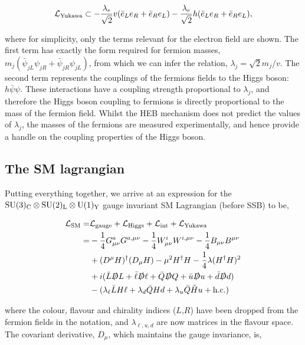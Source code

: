 \begin{equation}
   \mathcal{L}_{\rm{Yukawa}} \subset -\frac{\lambda_e}{\sqrt{2}}v(\bar{e}_Le_R+\bar{e}_Re_L)-\frac{\lambda_e}{\sqrt{2}}h(\bar{e}_Le_R+\bar{e}_Re_L),
\end{equation}

\noindent
where for simplicity, only the terms relevant for the electron field are shown. The first term has exactly the form required for fermion masses, $m_{j}(\bar{\psi}_{jL}\psi_{jR}+\bar{\psi}_{jR}\psi_{jL})$, from which we can infer the relation, $\lambda_j = \sqrt{2}m_j/v$. The second term represents the couplings of the fermions fields to the Higgs boson: $h\bar{\psi}\psi$. These interactions have a coupling strength proportional to $\lambda_j$, and therefore the Higgs boson coupling to fermions is directly proportional to the mass of the fermion field. Whilst the HEB mechanism does not predict the values of $\lambda_j$, the masses of the fermions are measured experimentally, and hence provide a handle on the coupling properties of the Higgs boson.

\subsection{The SM lagrangian}
Putting everything together, we arrive at an expression for the ${\rm{SU}}(3)_{\rm{C}} \otimes {\rm{SU}}(2)_{\rm{L}} \otimes {\rm{U}}(1)_{\rm{Y}}$ gauge invariant SM Lagrangian (before SSB) to be,

\begin{equation}
\begin{split}
    \mathcal{L}_{\rm{SM}} = & \mathcal{L}_{\rm{gauge}} + \mathcal{L}_{\rm{Higgs}} + \mathcal{L}_{\rm{int}} + \mathcal{L}_{\rm{Yukawa}}
    \\
    = &-\frac{1}{4}G^a_{\mu\nu}G^{a,\mu\nu} -\frac{1}{4}W^i_{\mu\nu}W^{i,\mu\nu} -\frac{1}{4}B_{\mu\nu}B^{\mu\nu} 
    \\
    &+ (D^\mu H)^{\dagger}(D_\mu H) - \mu^2H^{\dagger}H - \frac{1}{4}\lambda(H^{\dagger}H)^2
    \\
    &+ i(\bar{L}\slashed{D}L+\bar{\ell}\slashed{D}\ell+\bar{Q}\slashed{D}Q+\bar{u}\slashed{D}u+\bar{d}\slashed{D}d)
    \\
    &- (\lambda_\ell \bar{L} H \ell + \lambda_d \bar{Q} H d + \lambda_u \bar{Q} \tilde{H} u + {\rm{h.c.}})
\end{split}
\end{equation}

\noindent
where the colour, flavour and chirality indices ($L$,$R$) have been dropped from the fermion fields in the notation, and $\lambda_{\ell,u,d}$ are now matrices in the flavour space. The covariant derivative, $D_\mu$, which maintains the gauge invariance, is,

